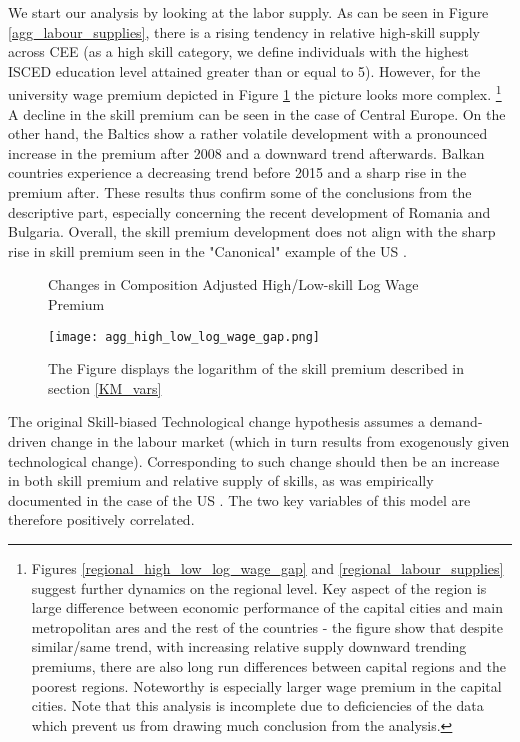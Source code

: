 \documentclass[11pt]{article}
\begin{document}
We start our analysis by looking at the labor supply. As can be seen in Figure \ref{agg_labour_supplies}, there is a rising tendency in relative high-skill supply across CEE (as a high skill category, we define individuals with the highest ISCED education level attained greater than or equal to 5). However, for the university wage premium depicted in Figure \ref{agg_high_low_log_wage_gap} the picture looks more complex.%
\footnote{Figures \ref{regional_high_low_log_wage_gap} and  \ref{regional_labour_supplies} suggest further dynamics on the regional level. Key aspect of the region is large difference between economic performance of the capital cities and main metropolitan ares and the rest of the countries - the figure show that despite similar/same trend, with increasing relative supply downward trending premiums, there are also long run differences between capital regions and the poorest regions. Noteworthy is especially larger wage premium in the capital cities. Note that this analysis is incomplete due to deficiencies of the data which prevent us from drawing much conclusion from the analysis.} 
A decline in the skill premium can be seen in the case of Central Europe. On the other hand, the Baltics show a rather volatile development with a pronounced increase in the premium after 2008 and a downward trend afterwards. Balkan countries experience a decreasing trend before 2015 and a sharp rise in the premium after. These results thus confirm some of the conclusions from the descriptive part, especially concerning the recent development of Romania and Bulgaria.
Overall, the skill premium development does not align with the sharp rise in skill premium seen in the "Canonical" example of the US \citep{acemoglu2002directed}. 

\begin{figure}[!htbp]%
    \centering
    \caption{Changes in Composition Adjusted High/Low-skill Log Wage Premium}
    {\texttt{[image: agg\_high\_low\_log\_wage\_gap.png]} }
    \label{agg_high_low_log_wage_gap}
    \caption*{\footnotesize The Figure displays the logarithm of the skill premium described in section \ref{KM_vars}}
\end{figure}

The original Skill-biased Technological change hypothesis assumes a demand-driven change in the labour market (which in turn results from exogenously given technological change). Corresponding to such change should then be an increase in both skill premium and relative supply of skills, as was empirically documented in the case of the US \citep{acemoglu2011skills}. The two key variables of this model are therefore positively correlated. 
\end{document}
